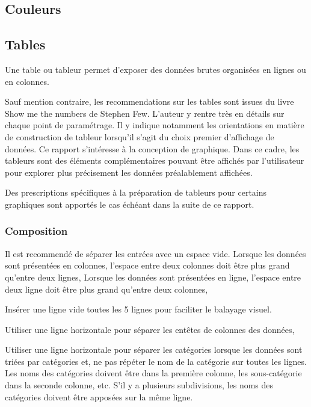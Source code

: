 \documentclass[a4paper,12pt]{article}
\begin{document}
\begin{multicols}{2}
\subsection*{Couleurs}
\label{sec:orgd6390e0}

\subsection*{Tables}
\label{sec:org9ff0d1e}
Une table ou tableur permet d'exposer des données brutes organisées en lignes ou en colonnes. \autocite{mikeyiHowChooseRight2020}

Sauf mention contraire, les recommendations sur les tables sont issues du livre \og Show me the numbers\fg{} de Stephen Few.\autocite{stephenfewTableDesign2012} L'auteur y rentre très en détails sur chaque point de paramétrage. Il y indique notamment les orientations en matière de construction de tableur lorsqu'il s'agit du choix premier d'affichage de données. Ce rapport s'intéresse à la conception de graphique. Dans ce cadre, les tableurs sont des éléments complémentaires pouvant être affichés par l'utilisateur pour explorer plus précisement les données préalablement affichées.

Des prescriptions spécifiques à la préparation de tableurs pour certains graphiques sont apportés le cas échéant dans la suite de ce rapport.
\subsubsection*{Composition}
\label{sec:orgb91f5ed}
Il est recommendé de séparer les entrées avec un espace vide.
Lorsque les données sont présentées en colonnes, l'espace entre deux colonnes doit être plus grand qu'entre deux lignes,
Lorsque les données sont présentées en ligne, l'espace entre deux ligne doit être plus grand qu'entre deux colonnes,

Insérer une ligne vide toutes les 5 lignes pour faciliter le balayage visuel. \autocite{NFENISO9241-125ErgonomieLinteractionHommesysteme2017}

Utiliser une ligne horizontale pour séparer les entêtes de colonnes des données,

Utiliser une ligne horizontale pour séparer les catégories lorsque les données sont triées par catégories et, ne pas répéter le nom de la catégorie sur toutes les lignes. Les noms des catégories doivent être dans la première colonne, les sous-catégorie dans la seconde colonne, etc. S'il y a plusieurs subdivisions, les noms des catégories doivent être apposées sur la même ligne.


\end{multicols}
\end{document}
